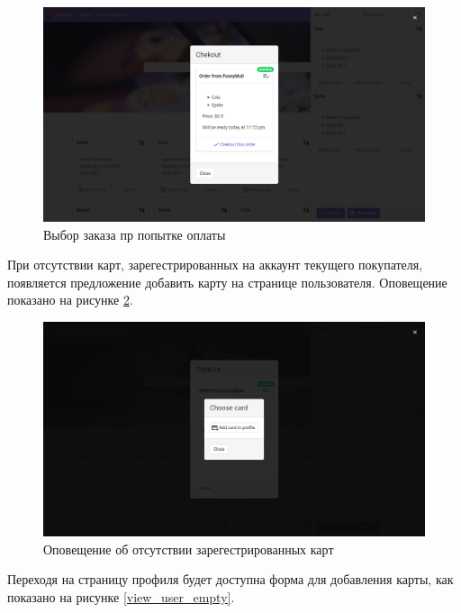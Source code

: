 {  \begin{figure}[H]
    \centering
    \includegraphics[width=\textwidth]{checkout_choose_order.png}
    \caption{Выбор заказа пр попытке оплаты}
    \label{view_checkout_orders}
  \end{figure}

  При отсутствии карт, зарегестрированных на аккаунт текущего покупателя,
  появляется предложение добавить карту на странице пользователя. Оповещение показано на рисунке \ref{view_checkout_cards}.

  \begin{figure}[H]
    \centering
    \includegraphics[width=\textwidth]{add_card_on_checkout.png}
    \caption{Оповещение об отсутствии зарегестрированных карт}
    \label{view_checkout_cards}
  \end{figure}

  Переходя на страницу профиля будет доступна форма для добавления карты, как показано на рисунке \ref{view_user_empty}.

}
